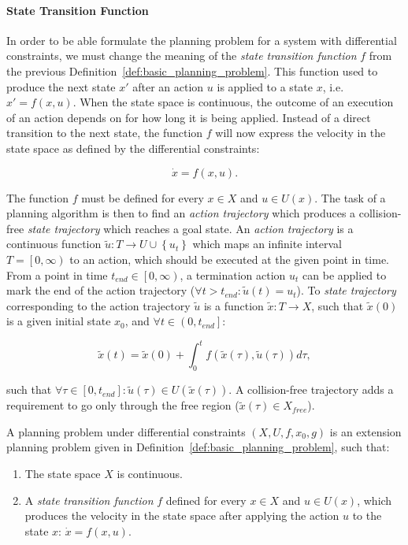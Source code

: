 \paragraph{State Transition Function}

In order to be able formulate the planning problem for a system with differential constraints, we must change the meaning of the \textit{state transition function} $f$ from the previous Definition~\ref{def:basic_planning_problem}. This function used to produce the next state $x'$ after an action $u$ is applied to a state $x$, i.e. $x'=f(x, u)$. When the state space is continuous, the outcome of an execution of an action depends on for how long it is being applied. Instead of a direct transition to the next state, the function $f$ will now express the velocity in the state space as defined by the differential constraints:

\[
	\dot{x}=f(x, u).
\]

The function $f$ must be defined for every $x\in X$ and $u\in U(x)$. The task of a planning algorithm is then to find an \textit{action trajectory} which produces a collision-free \textit{state trajectory} which reaches a goal state. An \textit{action trajectory} is a continuous function $\tilde{u}: T \rightarrow U\cup\left\{u_t\right\}$ which maps an infinite interval $T=\left[0, \infty\right)$ to an action, which should be executed at the given point in time. From a point in time $t_{end}\in\left[0, \infty\right)$, a termination action $u_t$ can be applied to mark the end of the action trajectory ($\forall t>t_{end}: \tilde{u}(t)=u_t$). To \textit{state trajectory} corresponding to the action trajectory $\tilde{u}$ is a function $\tilde{x}: T \rightarrow X$, such that $\tilde{x}(0)$ is a given initial state $x_0$, and $\forall t \in \left(0, t_{end}\right]$:

\begin{equation}
	\label{eq:integrate_state_trajectory}
	\tilde{x}(t) = \tilde{x}(0) + \int_0^t f(\tilde{x}(\tau), \tilde{u}(\tau)) d\tau,
\end{equation}

such that $\forall \tau\in\left[0, t_{end}\right]: \tilde{u}(\tau)\in U(\tilde{x}(\tau))$. A collision-free trajectory adds a requirement to go only through the free region ($\tilde{x}(\tau)\in X_{free}$).

\begin{defn}
	\label{def:planning_problem_under_differential_constraints}
	A planning problem under differential constraints $\left(X, U, f, x_0, g\right)$ is an extension planning problem given in Definition~\ref{def:basic_planning_problem}, such that:
	
	\begin{enumerate}
		\item The state space $X$ is continuous.
		\item A \textit{state transition function} $f$ defined for every $x\in X$ and $u\in U(x)$, which produces the velocity in the state space after applying the action $u$ to the state $x$: $\dot{x}=f(x, u)$.
	\end{enumerate}
\end{defn}

